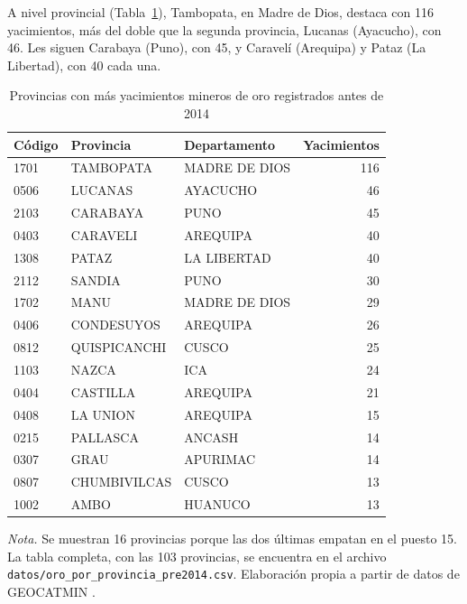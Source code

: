 \documentclass[man,12pt,a4paper,floatsintext,donotrepeattitle]{apa7}
\newcommand{\interlineadosencillo}{\renewcommand{\baselinestretch}{1}\selectfont}
\begin{document}
A nivel provincial (Tabla~\ref{tab:provincias}), Tambopata, en Madre de Dios,
destaca con 116 yacimientos, más del doble que la segunda provincia, Lucanas
(Ayacucho), con 46. Les siguen Carabaya (Puno), con 45, y Caravelí (Arequipa) y
Pataz (La Libertad), con 40 cada una.

\begin{table}[htbp]
\caption{Provincias con más yacimientos mineros de oro registrados antes de 2014}
\label{tab:provincias}
\centering
\interlineadosencillo
\begin{threeparttable}
\begin{tabular}{@{}lllr@{}}
\toprule
Código & Provincia & Departamento & Yacimientos \\
\midrule
1701 & TAMBOPATA         & MADRE DE DIOS & 116 \\
0506 & LUCANAS           & AYACUCHO      &  46 \\
2103 & CARABAYA          & PUNO          &  45 \\
0403 & CARAVELI          & AREQUIPA      &  40 \\
1308 & PATAZ             & LA LIBERTAD   &  40 \\
2112 & SANDIA            & PUNO          &  30 \\
1702 & MANU              & MADRE DE DIOS &  29 \\
0406 & CONDESUYOS        & AREQUIPA      &  26 \\
0812 & QUISPICANCHI      & CUSCO         &  25 \\
1103 & NAZCA             & ICA           &  24 \\
0404 & CASTILLA          & AREQUIPA      &  21 \\
0408 & LA UNION          & AREQUIPA      &  15 \\
0215 & PALLASCA          & ANCASH        &  14 \\
0307 & GRAU              & APURIMAC      &  14 \\
0807 & CHUMBIVILCAS      & CUSCO         &  13 \\
1002 & AMBO              & HUANUCO       &  13 \\
\bottomrule
\end{tabular}
\vspace{6pt}
\begin{tablenotes}[flushleft]
\small
\item \textit{Nota.} Se muestran 16 provincias porque las dos últimas empatan
en el puesto 15. La tabla completa, con las 103 provincias, se encuentra en el
archivo \texttt{datos/oro\_por\_provincia\_pre2014.csv}.
Elaboración propia a partir de datos de GEOCATMIN \parencite{ingemmet2026}.
\end{tablenotes}
\end{threeparttable}
\end{table}
\end{document}
